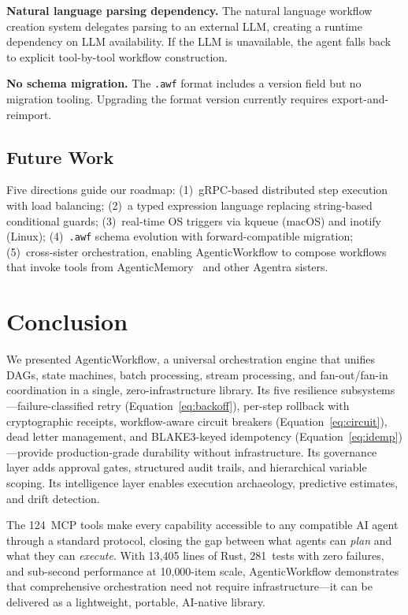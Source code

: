 \documentclass[10pt, twocolumn]{article}
\begin{document}
\textbf{Natural language parsing dependency.} The natural language workflow creation system delegates parsing to an external LLM, creating a runtime dependency on LLM availability. If the LLM is unavailable, the agent falls back to explicit tool-by-tool workflow construction.

\textbf{No schema migration.} The \texttt{.awf} format includes a version field but no migration tooling. Upgrading the format version currently requires export-and-reimport.

\subsection{Future Work}\label{sec:future}

Five directions guide our roadmap: (1)~gRPC-based distributed step execution with load balancing; (2)~a typed expression language replacing string-based conditional guards; (3)~real-time OS triggers via kqueue (macOS) and inotify (Linux); (4)~\texttt{.awf} schema evolution with forward-compatible migration; (5)~cross-sister orchestration, enabling AgenticWorkflow to compose workflows that invoke tools from AgenticMemory~\cite{owolabi2026agenticmemory} and other Agentra sisters.


\section{Conclusion}\label{sec:conclusion}

We presented AgenticWorkflow, a universal orchestration engine that unifies DAGs, state machines, batch processing, stream processing, and fan-out/fan-in coordination in a single, zero-infrastructure library. Its five resilience subsystems---failure-classified retry (Equation~\ref{eq:backoff}), per-step rollback with cryptographic receipts, workflow-aware circuit breakers (Equation~\ref{eq:circuit}), dead letter management, and BLAKE3-keyed idempotency (Equation~\ref{eq:idemp})---provide production-grade durability without infrastructure. Its governance layer adds approval gates, structured audit trails, and hierarchical variable scoping. Its intelligence layer enables execution archaeology, predictive estimates, and drift detection.

The 124~MCP tools make every capability accessible to any compatible AI agent through a standard protocol, closing the gap between what agents can \emph{plan} and what they can \emph{execute}. With 13{,}405 lines of Rust, 281~tests with zero failures, and sub-second performance at 10{,}000-item scale, AgenticWorkflow demonstrates that comprehensive orchestration need not require infrastructure---it can be delivered as a lightweight, portable, AI-native library.
\end{document}
